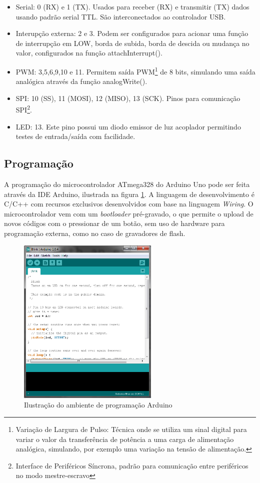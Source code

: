 \begin{itemize}
	\item Serial: 0 (RX) e 1 (TX). Usados para receber (RX) e transmitir (TX) dados usando padrão serial TTL. São interconectados ao controlador USB.
	\item Interupção externa: 2 e 3. Podem ser configurados para acionar uma função de interrupção em LOW, borda de subida, borda de descida ou mudança no valor, configurados na função attachInterrupt().
	\item PWM: 3,5,6,9,10 e 11. Permitem saída PWM\footnote{Variação de Largura de Pulso: Técnica onde se utiliza um sinal digital para variar o valor da transferência de potência a uma carga de alimentação analógica, simulando, por exemplo uma variação na tensão de alimentação.} de 8 bits, simulando uma saída analógica através da função analogWrite().
	\item SPI: 10 (SS), 11 (MOSI), 12 (MISO), 13 (SCK). Pinos para comunicação SPI\footnote{Interface de Periféricos Síncrona, padrão para comunicação entre periféricos no modo mestre-escravo}.
	\item LED: 13. Este pino possui um diodo emissor de luz acoplador permitindo testes de entrada/saída com facilidade.
\end{itemize} 

\subsection{Programação}

A programação do microcontrolador ATmega328 do Arduino Uno pode ser feita através da IDE Arduino, ilustrada na figura \ref{fig:ide}. A linguagem de desenvolvimento é C/C++ com recursos exclusivos desenvolvidos com base na linguagem \textit{Wiring}. O microcontrolador vem com um \textit{bootloader} pré-gravado, o que permite o upload de novos códigos com o pressionar de um botão, sem uso de hardware para programação externa, como no caso de gravadores de flash.

\begin{figure}[h!]
			\centering
			\includegraphics[width=0.6\textwidth]{figures/ideArduino204.png}
			\caption{Ilustra\c{c}\~{a}o do ambiente de programa\c{c}\~{a}o Arduino}
			\label{fig:ide}
\end{figure}

